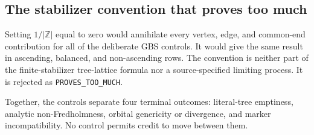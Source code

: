 \subsection{The stabilizer convention that proves too much}

Setting $1/|\mathbb Z|$ equal to zero would annihilate every vertex, edge,
and common-end contribution for all of the deliberate GBS controls.  It
would give the same result in ascending, balanced, and non-ascending rows.
The convention is neither part of the finite-stabilizer tree-lattice formula
nor a source-specified limiting process.  It is rejected as
\texttt{PROVES\_TOO\_MUCH}.

Together, the controls separate four terminal outcomes: literal-tree
emptiness, analytic non-Fredholmness, orbital genericity or divergence, and
marker incompatibility.  No control permits credit to move between them.
